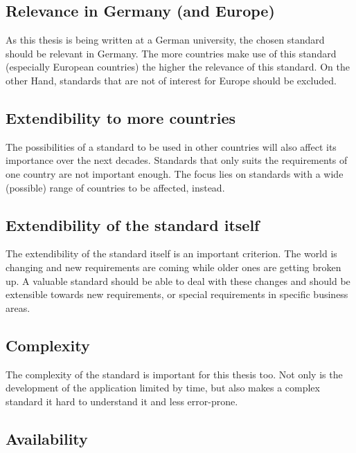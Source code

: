 \subsection{Relevance in Germany (and Europe)}
\label{sec2.2.2}
As this thesis is being written at a German university, the chosen standard should be relevant in Germany. The more countries make use of this standard (especially European countries) the higher the relevance of this standard. On the other Hand, standards that are not of interest for Europe should be excluded.

\subsection{Extendibility to more countries}
\label{sec2.2.3}
The possibilities of a standard to be used in other countries will also affect its importance over the next decades. Standards that only suits the requirements of one country are not important enough. The focus lies on standards with a wide (possible) range of countries to be affected, instead.

\subsection{Extendibility of the standard itself}
\label{sec2.2.4}
The extendibility of the standard itself is an important criterion. The world is changing and new requirements are coming while older ones are getting broken up. A valuable standard should be able to deal with these changes and should be extensible towards new requirements, or special requirements in specific business areas.

\subsection{Complexity}
\label{sec2.2.5}
The complexity of the standard is important for this thesis too. Not only is the development of the application limited by time, but also makes a complex standard it hard to understand it and less error-prone.

\subsection{Availability}
\label{sec2.2.6}

